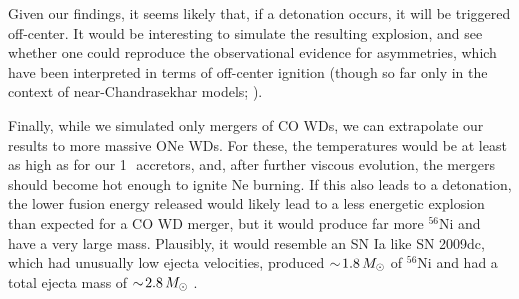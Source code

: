 Given our findings, it seems likely that, if a detonation occurs, it will be triggered off-center.  It would be interesting to simulate the resulting explosion, and see whether one could reproduce the observational evidence for asymmetries, which have been interpreted in terms of off-center ignition (though so far only in the context of near-Chandrasekhar models; \citealt{maed+10a,maed+10b}).

Finally, while we simulated only mergers of CO WDs, we can extrapolate our results to more massive ONe WDs.  For these, the temperatures would be at least as high as for our 1\,\Msun\ accretors, and, after further viscous evolution, the mergers should become hot enough to ignite Ne burning.  If this also leads to a detonation, the lower fusion energy released would likely lead to a less energetic explosion than expected for a CO WD merger, but it would produce far more $^{56}$Ni and have a very large mass.  Plausibly, it would resemble an SN Ia like SN 2009dc, which had unusually low ejecta velocities, produced $\sim\!1.8\,\Msun$ of $^{56}$Ni and had a total ejecta mass of $\sim\!2.8\,\Msun$ \citep{taub+09}.



